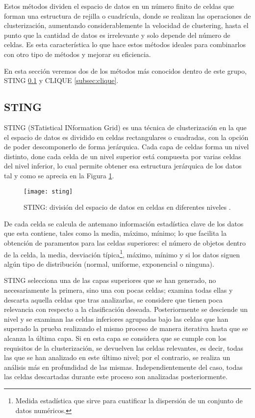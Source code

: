 \documentclass[10pt, a4paper]{article}
\begin{document}
Estos métodos dividen el espacio de datos en un número finito de celdas que forman una estructura de rejilla o cuadrícula, donde se realizan las operaciones de clusterización, aumentando considerablemente la velocidad de clustering, hasta el punto que la cantidad de datos es irrelevante y solo depende del número de celdas. Es esta característica lo que hace estos métodos ideales para combinarlos con otro tipo de métodos y mejorar su eficiencia.

En esta sección veremos dos de los métodos más conocidos dentro de este grupo, STING \ref{subsec:sting} y CLIQUE \ref{subsec:clique}.




\subsection{\textbf{STING}} \label{subsec:sting}

\cite{sting} STING (STatistical INformation Grid) es una técnica de clusterización en la que el espacio de datos es dividido en celdas rectangulares o cuadradas, con la opción de poder descomponerlo de forma jerárquica. Cada capa de celdas forma un nivel distinto, done cada celda de un nivel superior está compuesta por varias celdas del nivel inferior, lo cual permite obtener esa estructura jerárquica de los datos tal y como se aprecia en la Figura \ref{fig:sting}.

\begin{figure}[ht]
\centering
\texttt{[image: sting]}
\caption{STING: división del espacio de datos en celdas en diferentes niveles \cite{sting 2}.}
\label{fig:sting}
\end{figure}

De cada celda se calcula de antemano información estadística clave de los datos que esta contiene, tales como la media, máximo, mínimo; lo que facilita la obtención de paramentos para las celdas superiores: el número de objetos dentro de la celda, la media, desviación típica\footnote{Medida estadística que sirve para cuatificar la dispersión de un conjunto de datos numéricos.}, máximo, mínimo y si los datos siguen algún tipo de distribución (normal, uniforme, exponencial o ninguna). 

STING selecciona una de las capas superiores que se han generado, no necesariamente la primera, sino una con pocas celdas; examina todas ellas y descarta aquella celdas que tras analizarlas, se considere que tienen poca relevancia con respecto a la clasificación deseada. Posteriormente se desciende un nivel y se examinan las celdas inferiores agrupadas bajo las celdas que han superado la prueba realizando el mismo proceso de manera iterativa hasta que se alcanza la última capa. Si en esta capa se considera que se cumple con los requisitos de la clusterización, se devuelven las celdas relevantes, es decir, todas las que se han analizado en este último nivel; por el contrario, se realiza un análisis más en profundidad de las mismas. Independientemente del caso, todas las celdas descartadas durante este proceso son analizadas posteriormente. 
\end{document}

